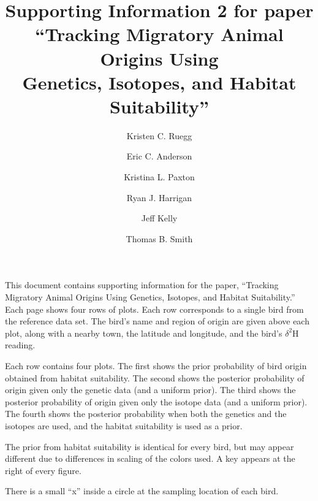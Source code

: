 \documentclass[11pt,landscape]{article}
\title{Supporting Information 2 for paper\\
``Tracking Migratory Animal Origins Using \\
Genetics, Isotopes, and Habitat Suitability''}
\author{Kristen C. Ruegg \and  
         Eric C. Anderson \and 
         Kristina L. Paxton\and 
         Ryan J. Harrigan \and
         Jeff Kelly \and
         Thomas B. Smith
         }
\begin{document}
\maketitle


This document contains supporting information for the paper, ``Tracking Migratory Animal Origins Using
Genetics, Isotopes, and Habitat Suitability.''  Each page shows four rows of plots.  Each row corresponds
to a single bird from the reference data set.  The bird's name and region of origin are given above each plot,
along with a nearby town, the latitude and longitude, and the bird's $\delta^2\mathrm{H}$ reading.  

Each row contains four plots. The first shows the prior probability of bird origin obtained from habitat suitability.
The second shows the posterior probability of origin given only the genetic data (and a uniform prior).  
The third shows the posterior probability of origin given only the isotope data (and a uniform prior).
The fourth shows
the posterior probability when both the genetics and the isotopes are used, and the habitat suitability is used as a prior.  

The prior from habitat suitability is identical for every bird, but may appear different due to differences in scaling of the 
colors used. A key appears at the right of every figure.

There is a small ``x'' inside a circle at the sampling location of each bird.
\newpage





 
\end{document}
